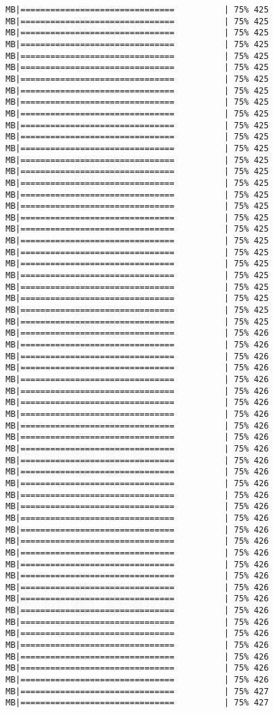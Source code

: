 \documentclass[
]{article}
\begin{document}
\begin{verbatim}
MB|===============================          | 75% 425 MB|===============================          | 75% 425 MB|===============================          | 75% 425 MB|===============================          | 75% 425 MB|===============================          | 75% 425 MB|===============================          | 75% 425 MB|===============================          | 75% 425 MB|===============================          | 75% 425 MB|===============================          | 75% 425 MB|===============================          | 75% 425 MB|===============================          | 75% 425 MB|===============================          | 75% 425 MB|===============================          | 75% 425 MB|===============================          | 75% 425 MB|===============================          | 75% 425 MB|===============================          | 75% 425 MB|===============================          | 75% 425 MB|===============================          | 75% 425 MB|===============================          | 75% 425 MB|===============================          | 75% 425 MB|===============================          | 75% 425 MB|===============================          | 75% 425 MB|===============================          | 75% 425 MB|===============================          | 75% 425 MB|===============================          | 75% 425 MB|===============================          | 75% 425 MB|===============================          | 75% 425 MB|===============================          | 75% 425 MB|===============================          | 75% 426 MB|===============================          | 75% 426 MB|===============================          | 75% 426 MB|===============================          | 75% 426 MB|===============================          | 75% 426 MB|===============================          | 75% 426 MB|===============================          | 75% 426 MB|===============================          | 75% 426 MB|===============================          | 75% 426 MB|===============================          | 75% 426 MB|===============================          | 75% 426 MB|===============================          | 75% 426 MB|===============================          | 75% 426 MB|===============================          | 75% 426 MB|===============================          | 75% 426 MB|===============================          | 75% 426 MB|===============================          | 75% 426 MB|===============================          | 75% 426 MB|===============================          | 75% 426 MB|===============================          | 75% 426 MB|===============================          | 75% 426 MB|===============================          | 75% 426 MB|===============================          | 75% 426 MB|===============================          | 75% 426 MB|===============================          | 75% 426 MB|===============================          | 75% 426 MB|===============================          | 75% 426 MB|===============================          | 75% 426 MB|===============================          | 75% 426 MB|===============================          | 75% 426 MB|===============================          | 75% 426 MB|===============================          | 75% 427 MB|===============================          | 75% 427 
\end{verbatim}
\end{document}
